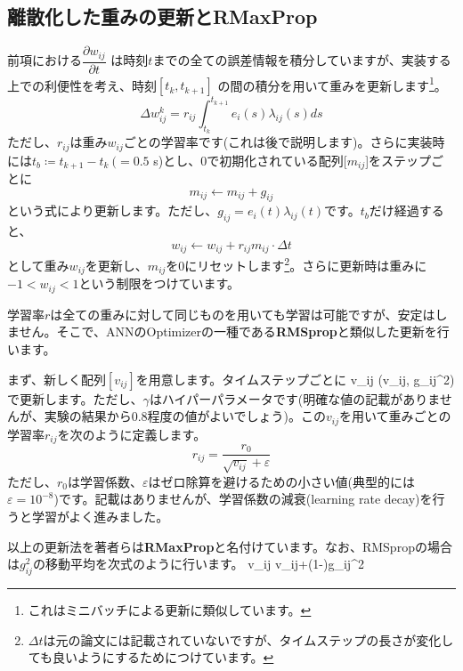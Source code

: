 \subsection{離散化した重みの更新とRMaxProp}
前項における$\dfrac{\partial w_{ij}}{\partial t}$ は時刻$t$までの全ての誤差情報を積分していますが、実装する上での利便性を考え、時刻$[t_k, t_{k+1}]$ の間の積分を用いて重みを更新します\footnote{これはミニバッチによる更新に類似しています。}。
\begin{equation}
\Delta w_{i j}^{k}=r_{ij} \int_{t_{k}}^{t_{k+1}} e_{i}(s) \lambda_{ij}(s) ds      
\end{equation}
ただし、$r_{ij}$は重み$w_{ij}$ごとの学習率です(これは後で説明します)。さらに実装時には$t_b\coloneqq {t_{k+1}}-{t_{k}}\ (=0.5$ s)とし、0で初期化されている配列[$m_{ij}$]をステップごとに
\begin{equation}
m_{ij} \leftarrow m_{ij} + g_{ij}    
\end{equation}
という式により更新します。ただし、$g_{ij}=e_{i}(t) \lambda_{ij}(t)$です。$t_b$だけ経過すると、
\begin{equation}
w_{ij} \leftarrow w_{ij} + r_{ij}m_{ij}\cdot \Delta t
\end{equation}
として重み$w_{ij}$を更新し、$m_{ij}$を0にリセットします\footnote{$\Delta t$は元の論文には記載されていないですが、タイムステップの長さが変化しても良いようにするためにつけています。}。さらに更新時は重みに$-1<w_{ij}<1$という制限をつけています。\par
学習率$r$は全ての重みに対して同じものを用いても学習は可能ですが、安定はしません。そこで、ANNのOptimizerの一種である\textbf{RMSprop}と類似した更新を行います。\par
まず、新しく配列$[v_{ij}]$を用意します。タイムステップごとに
v_{ij} \leftarrow \max(\gamma v_{ij}, g_{ij}^2)
で更新します。ただし、$\gamma$はハイパーパラメータです(明確な値の記載がありませんが、実験の結果から0.8程度の値がよいでしょう)。この$v_{ij}$を用いて重みごとの学習率$r_{ij}$を次のように定義します。
\begin{equation}
r_{ij}=\frac{r_0}{\sqrt{v_{ij}}+\varepsilon}
\end{equation}
ただし、$r_0$は学習係数、$\varepsilon$はゼロ除算を避けるための小さい値(典型的には$\varepsilon=10^{-8}$)です。記載はありませんが、学習係数の減衰(learning rate decay)を行うと学習がよく進みました。\par
以上の更新法を著者らは\textbf{RMaxProp}と名付けています。なお、RMSpropの場合は$g_{ij}^2$の移動平均を次式のように行います。
v_{ij} \leftarrow \gamma v_{ij}+(1-\gamma)\cdot g_{ij}^2
